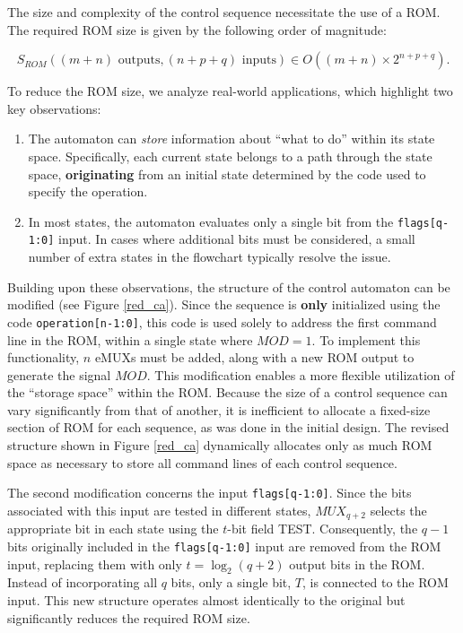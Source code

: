 The size and complexity of the control sequence necessitate the use of a ROM. The required ROM size is given by the following order of magnitude:

\[
S_{ROM}((m+n) \text{ outputs}, (n+p+q) \text{ inputs}) \in O((m+n) \times 2^{n+p+q}).
\]

To reduce the ROM size, we analyze real-world applications, which highlight two key observations:

\begin{enumerate}
    \item The automaton can {\em store} information about ``what to do'' within its state space. Specifically, each current state belongs to a path through the state space, {\bf originating} from an initial state determined by the code used to specify the operation.
    
    \item In most states, the automaton evaluates only a single bit from the {\tt flags[q-1:0]} input. In cases where additional bits must be considered, a small number of extra states in the flowchart typically resolve the issue.
\end{enumerate}



Building upon these observations, the structure of the control automaton can be modified (see Figure \ref{red_ca}). Since the sequence is {\bf only} initialized using the code {\tt operation[n-1:0]}, this code is used solely to address the first command line in the ROM, within a single state where $MOD=1$. To implement this functionality, $n$ eMUXs must be added, along with a new ROM output to generate the signal $MOD$. This modification enables a more flexible utilization of the ``storage space'' within the ROM. Because the size of a control sequence can vary significantly from that of another, it is inefficient to allocate a fixed-size section of ROM for each sequence, as was done in the initial design. The revised structure shown in Figure \ref{red_ca} dynamically allocates only as much ROM space as necessary to store all command lines of each control sequence.

The second modification concerns the input {\tt flags[q-1:0]}. Since the bits associated with this input are tested in different states, $MUX_{q+2}$ selects the appropriate bit in each state using the $t$-bit field TEST. Consequently, the $q-1$ bits originally included in the {\tt flags[q-1:0]} input are removed from the ROM input, replacing them with only $t = \log_2 (q+2)$ output bits in the ROM. Instead of incorporating all $q$ bits, only a single bit, $T$, is connected to the ROM input. This new structure operates almost identically to the original but significantly reduces the required ROM size.

